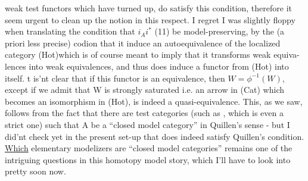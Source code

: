 weak test functors which have turned up,  do satisfy this condition,  
therefore it  seem urgent to clean up the notion in this respect.
 I regret I was slightly floppy when translating the condition  that
\inserted{$\phi =$} $i_A i^*$  (11)  be model-preserving,  by the (a priori less precise)
codion that it induce an autoequivalence of the localized category
(Hot)\unsure{\over{,}{;}}\hand{(}which is of course meant to imply that it transforms weak equiva-%
lences into weak equivalences,  and thus does induce a functor from (Hot)
into itself\hand{)}.  t is'nt clear that if this functor is an equivalence,
then  $W = \phi^{-1}(W)$,  except if we admit that W is strongly saturated  i.e.
an arrow in (Cat) which becomes an isomorphism in (Hot),  is indeed a
quasi-equivalence.  This, as we saw,  follows from the fact that there
are  test categories (such as \hand{\ensuremath{\Delta}} , which is even a strict one)\hand{,} such that
A\hand{\ensuremath{^{\wedge}}}  be a ``closed model category'' in Quillen's sense  -  but I did'nt check
yet in the present set-up that \hand{\ensuremath{\Delta}}\hand{\ensuremath{^{\wedge}}} does indeed satisfy Quillen's condition.
\uline{Which} elementary modelizers are ``closed model categories'' remains one of
the intriguing questions in this homotopy model story,  which I'll have to
look into pretty soon now.

